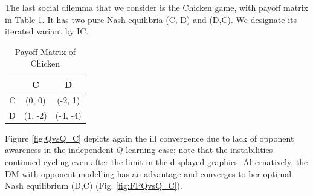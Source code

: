
The last social dilemma that we consider is the Chicken game, with payoff matrix in Table \ref{tab:payoffC}. It has two pure Nash equilibria (C, D) and (D,C). We designate its iterated variant by IC.

\begin{table}[h!]
\begin{center}
\begin{tabular}{c|c|c}
\hline
 & C & D \\
\hline
C & (0, 0) & (-2, 1) \\
\hline
D & (1, -2) & (-4, -4)  \\
\hline
\end{tabular}
\end{center}
\caption{Payoff Matrix of Chicken}
\label{tab:payoffC}
\vspace{-2ex}
\end{table}
\noindent 
Figure \ref{fig:QvsQ_C} depicts 
again the ill convergence due to lack of opponent awareness in the
independent $Q$-learning case; note that the instabilities continued cycling
even after the limit in the displayed graphics. Alternatively, the DM
with opponent modelling has an advantage and converges to her optimal Nash
equilibrium (D,C) (Fig. \ref{fig:FPQvsQ_C}).

